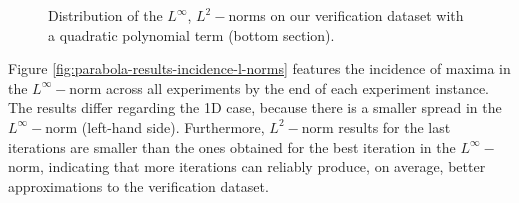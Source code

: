 \documentclass[12pt]{report} %
\begin{document}
\begin{figure}
\begin{tabular}{cccccc}
  \end{tabular}
  \caption{Distribution of the $L^\infty$, $L^2-$norms on our verification dataset
    with a quadratic polynomial term (bottom section).}
  \label{fig:parabola-results-overall-poly2}
\end{figure}

Figure \ref{fig:parabola-results-incidence-l-norms} features the incidence of maxima in the $L^\infty-$norm across all experiments by the end of each experiment instance. The results differ regarding the 1D case, because there is a smaller spread in the $L^\infty-$norm (left-hand side). Furthermore, $L^2-$norm results for the last iterations are smaller than the ones obtained for the best iteration in the $L^\infty-$norm, indicating that more iterations can reliably produce, on average, better approximations to the verification dataset.
\end{document}
